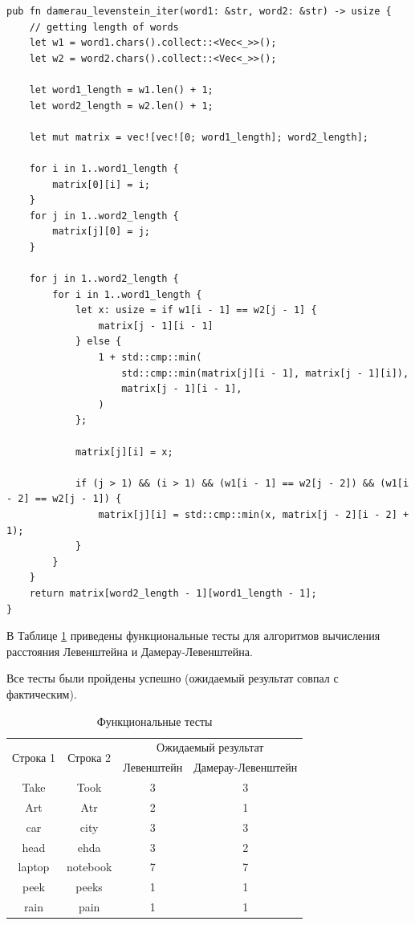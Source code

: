 \documentclass[12pt]{report}
\begin{document}
\begin{lstlisting}[label=some-code,caption=Функция нахождения расстояния Дамерау-Левенштейна матрично]
pub fn damerau_levenstein_iter(word1: &str, word2: &str) -> usize {
    // getting length of words
    let w1 = word1.chars().collect::<Vec<_>>();
    let w2 = word2.chars().collect::<Vec<_>>();

    let word1_length = w1.len() + 1;
    let word2_length = w2.len() + 1;

    let mut matrix = vec![vec![0; word1_length]; word2_length];

    for i in 1..word1_length {
        matrix[0][i] = i;
    }
    for j in 1..word2_length {
        matrix[j][0] = j;
    }

    for j in 1..word2_length {
        for i in 1..word1_length {
            let x: usize = if w1[i - 1] == w2[j - 1] {
                matrix[j - 1][i - 1]
            } else {
                1 + std::cmp::min(
                    std::cmp::min(matrix[j][i - 1], matrix[j - 1][i]),
                    matrix[j - 1][i - 1],
                )
            };

            matrix[j][i] = x;

            if (j > 1) && (i > 1) && (w1[i - 1] == w2[j - 2]) && (w1[i - 2] == w2[j - 1]) {
                matrix[j][i] = std::cmp::min(x, matrix[j - 2][i - 2] + 1);
            }
        }
    }
    return matrix[word2_length - 1][word1_length - 1];
}
\end{lstlisting}

\clearpage

В Таблице \ref{tab:func_tests} приведены функциональные тесты для алгоритмов вычисления расстояния Левенштейна и Дамерау-Левенштейна.

Все тесты были пройдены успешно (ожидаемый результат совпал с фактическим).

\begin{table}[h]
	\centering
	\begin{tabular}{|c|c|c|c|}
		\hline
		\multirow{2}{*}{Строка 1} & \multirow{2}{*}{Строка 2} & \multicolumn{2}{c|}{Ожидаемый результат} \\ \cline{3-4} 
		&          & Левенштейн & Дамерау-Левенштейн \\ \hline
		Take   & Took     & 3          & 3                   \\ \hline
		Art    & Atr      & 2          & 1                   \\ \hline
		car    & city     & 3          & 3                   \\ \hline
		head   & ehda     & 3          & 2                   \\ \hline
		laptop & notebook & 7          & 7                   \\ \hline
		peek   & peeks    & 1          & 1                   \\ \hline
		rain   & pain     & 1          & 1                   \\ \hline
	\end{tabular}
	\caption{Функциональные тесты}
	\label{tab:func_tests}
\end{table}
	
\end{document}

